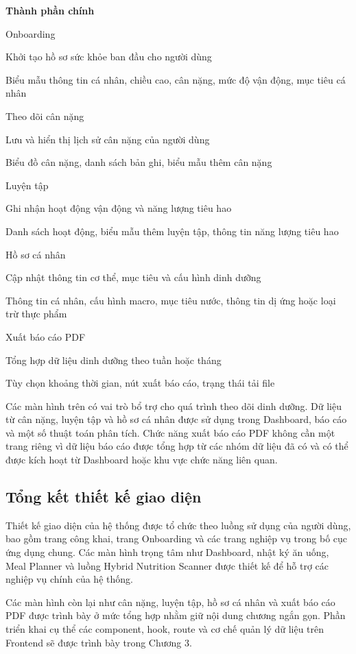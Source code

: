\documentclass[12pt, a4paper]{report}
\begin{document}
\textbf{Thành phần chính}

Onboarding

Khởi tạo hồ sơ sức khỏe ban đầu cho người dùng

Biểu mẫu thông tin cá nhân, chiều cao, cân nặng, mức độ vận động, mục tiêu cá nhân

Theo dõi cân nặng

Lưu và hiển thị lịch sử cân nặng của người dùng

Biểu đồ cân nặng, danh sách bản ghi, biểu mẫu thêm cân nặng

Luyện tập

Ghi nhận hoạt động vận động và năng lượng tiêu hao

Danh sách hoạt động, biểu mẫu thêm luyện tập, thông tin năng lượng tiêu hao

Hồ sơ cá nhân

Cập nhật thông tin cơ thể, mục tiêu và cấu hình dinh dưỡng

Thông tin cá nhân, cấu hình macro, mục tiêu nước, thông tin dị ứng hoặc loại trừ thực phẩm

Xuất báo cáo PDF

Tổng hợp dữ liệu dinh dưỡng theo tuần hoặc tháng

Tùy chọn khoảng thời gian, nút xuất báo cáo, trạng thái tải file

Các màn hình trên có vai trò bổ trợ cho quá trình theo dõi dinh dưỡng. Dữ liệu từ cân nặng, luyện tập và hồ sơ cá nhân được sử dụng trong Dashboard, báo cáo và một số thuật toán phân tích. Chức năng xuất báo cáo PDF không cần một trang riêng vì dữ liệu báo cáo được tổng hợp từ các nhóm dữ liệu đã có và có thể được kích hoạt từ Dashboard hoặc khu vực chức năng liên quan.

\subsection{Tổng kết thiết kế giao diện}Thiết kế giao diện của hệ thống được tổ chức theo luồng sử dụng của người dùng, bao gồm trang công khai, trang Onboarding và các trang nghiệp vụ trong bố cục ứng dụng chung. Các màn hình trọng tâm như Dashboard, nhật ký ăn uống, Meal Planner và luồng Hybrid Nutrition Scanner được thiết kế để hỗ trợ các nghiệp vụ chính của hệ thống.

Các màn hình còn lại như cân nặng, luyện tập, hồ sơ cá nhân và xuất báo cáo PDF được trình bày ở mức tổng hợp nhằm giữ nội dung chương ngắn gọn. Phần triển khai cụ thể các component, hook, route và cơ chế quản lý dữ liệu trên Frontend sẽ được trình bày trong Chương 3.
\end{document}
